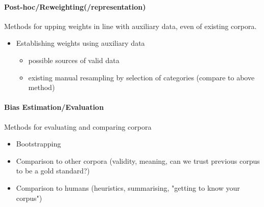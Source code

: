 \paragraph{Post-hoc/Reweighting(/representation)}
Methods for upping weights in line with auxiliary data, even of existing corpora.

\begin{itemize}
 \item Establishing weights using auxiliary data
    \begin{itemize}
    \item possible sources of valid data
    \item existing manual resampling by selection of categories (compare to above method)
    \end{itemize}
\end{itemize}


\paragraph{Bias Estimation/Evaluation}
Methods for evaluating and comparing corpora

\begin{itemize}
 \item Bootstrapping
 \item Comparison to other corpora (validity, meaning, can we trust previous corpus to be a gold standard?)
 \item Comparison to humans (heuristics, summarising, "getting to know your corpus")
\end{itemize}




















